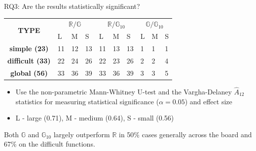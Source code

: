 \documentclass{beamer}
\newcommand{\Random}{\mathbb{R}}
\newcommand{\Genetic}{\mathbb{G}}
\newcommand{\RGenetic}{\mathbb{G}_{10}}
\begin{document}
\begin{frame}{RQ3: Are the results statistically significant?}
  \footnotesize
  \begin{table}
     \scriptsize
     \centering
     \begin{tabular}{c|p{3mm}p{3mm}p{3mm}|p{3mm}p{3mm}p{3mm}|p{3mm}p{3mm}p{3mm}}
      \toprule
      \multirow{2}{*}{\textbf{TYPE}} & \multicolumn{3}{c|}{$\Random / \Genetic$} & \multicolumn{3}{c|}{$\Random / \RGenetic$} & \multicolumn{3}{c}{$\Genetic / \RGenetic$} \\
      \cline{2-10}
                              & L  & M  & S  & L  & M  & S  & L & M & S \\
      \midrule
      \textbf{simple (23)}    & 11 & 12 & 13 & 11 & 13 & 13 & 1 & 1 & 1 \\
      \textbf{difficult (33)} & 22 & 24 & 26 & 22 & 23 & 26 & 2 & 2 & 4 \\
      \midrule
      \textbf{global (56)}    & 33 & 36 & 39 & 33 & 36 & 39 & 3 & 3 & 5 \\
      \bottomrule
    \end{tabular}
\end{table}

\begin{itemize}
  \item Use the non-parametric Mann-Whitney U-test and the Vargha-Delaney $\hat{A}_{12}$ statistics for measuring statistical significance ($\alpha=0.05$) and effect size~\cite{arcuri2011practical}
    \item L - large  (0.71), M - medium (0.64), S - small (0.56)
\end{itemize}

\begin{block}{}
    Both $\Genetic$ and $\RGenetic$ largely outperform $\Random$ in 50\% cases generally across the board and 67\% on the difficult functions.
\end{block}
\end{frame}
\end{document}
